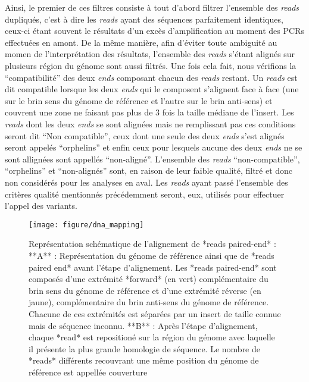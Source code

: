 \documentclass[12pt,twoside]{reedthesis}
\theoremstyle{definition}
\theoremstyle{definition}
\theoremstyle{remark}
\begin{document}
  Ainsi, le premier de ces filtres consiste à tout d'abord filtrer
  l'ensemble des \emph{reads} dupliqués, c'est à dire les \emph{reads}
  ayant des séquences parfaitement identiques, ceux-ci étant souvent le
  résultats d'un excès d'amplification au moment des PCRs effectuées en
  amont. De la même manière, afin d'éviter toute ambiguité au momen de
  l'interprétation des résultats, l'ensemble des \emph{reads} s'étant
  alignés sur plusieurs région du génome sont aussi filtrés. Une fois cela
  fait, nous vérifions la ``compatibilité'' des deux \emph{ends} composant
  chacun des \emph{reads} restant. Un \emph{reads} est dit compatible
  lorsque les deux \emph{ends} qui le composent s'alignent face à face
  (une sur le brin sens du génome de référence et l'autre sur le brin
  anti-sens) et couvrent une zone ne faisant pas plus de 3 fois la taille
  médiane de l'insert. Les \emph{reads} dont les deux \emph{ends} se sont
  alignées mais ne remplissant pas ces conditions seront dit ``Non
  compatible'', ceux dont une seule des deux \emph{ends} s'est alignés
  seront appelés ``orphelins'' et enfin ceux pour lesquels aucune des deux
  \emph{ends} ne se sont allignées sont appellés ``non-aligné''.
  L'ensemble des \emph{reads} ``non-compatible'', ``orphelins'' et
  ``non-alignés'' sont, en raison de leur faible qualité, filtré et donc
  non considérés pour les analyses en aval. Les \emph{reads} ayant passé
  l'ensemble des critères qualité mentionnés précédemment seront, eux,
  utilisés pour effectuer l'appel des variants.
  
  \newpage
  
  \begin{figure}
  
  {\centering \texttt{[image: figure/dna\_mapping]} 
  
  }
  
  \caption[Représentation schématique de l'alignement de *reads paired-end*]{Représentation schématique de l'alignement de *reads paired-end* : **A** : Représentation du génome de référence ainsi que de *reads paired end* avant l'étape d'alignement. Les *reads paired-end* sont composés d'une extrémité *forward* (en vert) complémentaire du brin sens du génome de référence et d'une extrémité réverse (en jaune), complémentaire du brin anti-sens du génome de référence. Chacune de ces extrémités est séparées par un insert de taille connue mais de séquence inconnu. **B** : Après l'étape d'alignement, chaque *read* est repositioné sur la région du génome avec laquelle il présente la plus grande homologie de séquence. Le nombre de *reads* différents recouvrant une même position du génome de référence est appellée couverture}\label{fig:picdnamapping}
  \end{figure}
  
\end{document}
